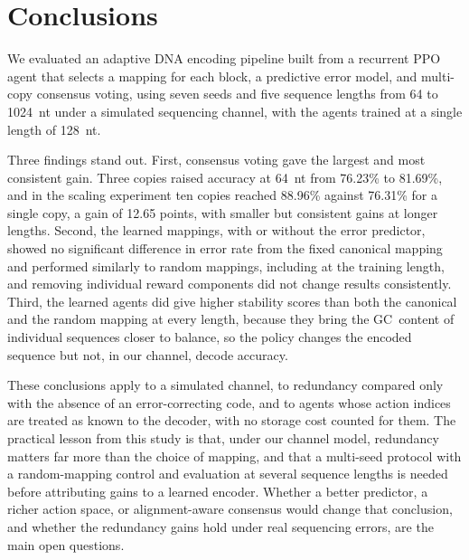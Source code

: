 \documentclass[entropy,article,submit,moreauthors]{Definitions/mdpi}
\begin{document}
\section{Conclusions}
\label{sec:conclusion}

We evaluated an adaptive DNA encoding pipeline built from a recurrent PPO agent that selects a mapping for each block, a predictive error model, and multi-copy consensus voting, using seven seeds and five sequence lengths from 64 to 1024~nt under a simulated sequencing channel, with the agents trained at a single length of 128~nt.

Three findings stand out. First, consensus voting gave the largest and most consistent gain. Three copies raised accuracy at 64~nt from 76.23\% to 81.69\%, and in the scaling experiment ten copies reached 88.96\% against 76.31\% for a single copy, a gain of 12.65 points, with smaller but consistent gains at longer lengths. Second, the learned mappings, with or without the error predictor, showed no significant difference in error rate from the fixed canonical mapping and performed similarly to random mappings, including at the training length, and removing individual reward components did not change results consistently. Third, the learned agents did give higher stability scores than both the canonical and the random mapping at every length, because they bring the GC~content of individual sequences closer to balance, so the policy changes the encoded sequence but not, in our channel, decode accuracy.

These conclusions apply to a simulated channel, to redundancy compared only with the absence of an error-correcting code, and to agents whose action indices are treated as known to the decoder, with no storage cost counted for them. The practical lesson from this study is that, under our channel model, redundancy matters far more than the choice of mapping, and that a multi-seed protocol with a random-mapping control and evaluation at several sequence lengths is needed before attributing gains to a learned encoder. Whether a better predictor, a richer action space, or alignment-aware consensus would change that conclusion, and whether the redundancy gains hold under real sequencing errors, are the main open questions.

\vspace{6pt}

\end{document}
